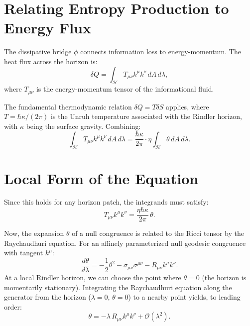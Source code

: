 \documentclass[12pt,a4paper]{book}
\begin{document}
\section{Relating Entropy Production to Energy Flux}

The dissipative bridge $\phi$ connects information loss to energy-momentum. The heat flux across the horizon is:
\begin{equation}
    \delta Q = \int_{\mathcal{H}} T_{\mu\nu} k^\mu k^\nu \, dA \, d\lambda,
\end{equation}
where $T_{\mu\nu}$ is the energy-momentum tensor of the informational fluid.

The fundamental thermodynamic relation $\delta Q = T \delta S$ applies, where $T = \hbar \kappa / (2\pi)$ is the Unruh temperature associated with the Rindler horizon, with $\kappa$ being the surface gravity. Combining:
\begin{equation}
    \int_{\mathcal{H}} T_{\mu\nu} k^\mu k^\nu \, dA \, d\lambda = \frac{\hbar \kappa}{2\pi} \cdot \eta \int_{\mathcal{H}} \theta \, dA \, d\lambda.
\end{equation}

\section{Local Form of the Equation}

Since this holds for any horizon patch, the integrands must satisfy:
\begin{equation}
    T_{\mu\nu} k^\mu k^\nu = \frac{\eta \hbar \kappa}{2\pi} \, \theta.
\end{equation}

Now, the expansion $\theta$ of a null congruence is related to the Ricci tensor by the Raychaudhuri equation. For an affinely parameterized null geodesic congruence with tangent $k^\mu$:
\begin{equation}
    \frac{d\theta}{d\lambda} = -\frac12 \theta^2 - \sigma_{\mu\nu}\sigma^{\mu\nu} - R_{\mu\nu} k^\mu k^\nu.
\end{equation}
At a local Rindler horizon, we can choose the point where $\theta = 0$ (the horizon is momentarily stationary). Integrating the Raychaudhuri equation along the generator from the horizon ($\lambda=0$, $\theta=0$) to a nearby point yields, to leading order:
\begin{equation}
    \theta = -\lambda \, R_{\mu\nu} k^\mu k^\nu + \mathcal{O}(\lambda^2).
\end{equation}
\end{document}
